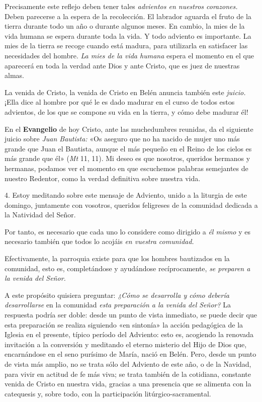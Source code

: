 \documentclass[]{article}
\begin{document}
Precisamente este reflejo deben tener tales \emph{advientos en nuestros
corazones.} Deben parecerse a la espera de la recolección. El labrador
aguarda el fruto de la tierra durante todo un año o durante algunos
meses. En cambio, la mies de la vida humana se espera durante toda la
vida. Y todo adviento es importante. La mies de la tierra se recoge
cuando está madura, para utilizarla en satisfacer las necesidades del
hombre. \emph{La mies de la vida humana} espera el momento en el que
aparecerá en toda la verdad ante Dios y ante Cristo, que es juez de
nuestras almas.

La venida de Cristo, la venida de Cristo en Belén anuncia también este
\emph{juicio.} ¡Ella dice al hombre por qué le es dado madurar en el
curso de todos estos advientos, de los que se compone su vida en la
tierra, y cómo debe madurar él!

En el \textbf{Evangelio} de hoy Cristo, ante las muchedumbres reunidas,
da el siguiente juicio sobre \emph{Juan Bautista:} «Os aseguro que no ha
nacido de mujer uno más grande que Juan el Bautista, aunque el más
pequeño en el Reino de los cielos es más grande que él» (\emph{Mt} 11,
11). Mi deseo es que nosotros, queridos hermanos y hermanas, podamos ver
el momento en que escuchemos palabras semejantes de nuestro Redentor,
como la verdad definitiva sobre nuestra vida.

4. Estoy meditando sobre este mensaje de Adviento, unido a la liturgia
de este domingo, juntamente con vosotros, queridos feligreses de la
comunidad dedicada a la Natividad del Señor.

Por tanto, es necesario que cada uno lo considere como dirigido a
\emph{él mismo} y es necesario también que todos lo acojáis \emph{en
vuestra comunidad.}

Efectivamente, la parroquia existe para que los hombres bautizados en la
comunidad, esto es, completándose y ayudándose recíprocamente, \emph{se
preparen a la venida del Señor.}

A este propósito quisiera preguntar: \emph{¿Cómo se desarrolla y cómo
debería desarrollarse} en la comunidad \emph{esta preparación a la
venida del Señor?} La respuesta podría ser doble: desde un punto de
vista inmediato, se puede decir que esta preparación se realiza
siguiendo «en sintonía» la acción pedagógica de la Iglesia en el
presente, típico período del Adviento: esto es, acogiendo la renovada
invitación a la conversión y meditando el eterno misterio del Hijo de
Dios que, encarnándose en el seno purísimo de María, nació en Belén.
Pero, desde un punto de vista más amplio, no se trata sólo del Adviento
de este año, o de la Navidad, para vivir en actitud de fe más viva; se
trata también de la cotidiana, constante venida de Cristo en nuestra
vida, gracias a una presencia que se alimenta con la catequesis y, sobre
todo, con la participación litúrgico-sacramental.
\end{document}
